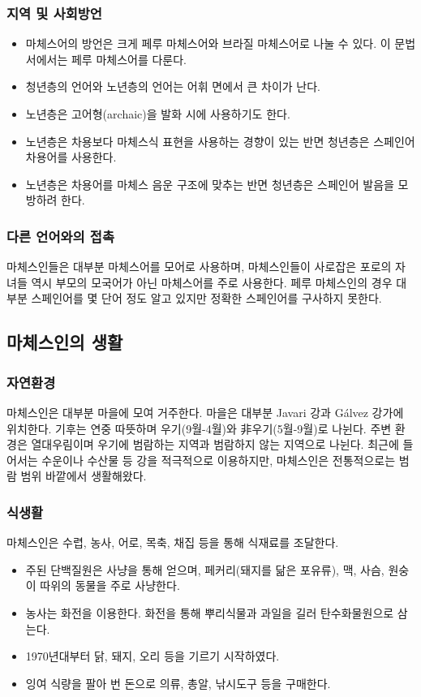 \subsubsection{지역 및 사회방언}
\begin{itemize}
\item 마체스어의 방언은 크게 페루 마체스어와 브라질 마체스어로 나눌 수 있다. 이 문법서에서는 페루 마체스어를 다룬다. 
\item 청년층의 언어와 노년층의 언어는 어휘 면에서 큰 차이가 난다. 
\item 노년층은 고어형(archaic)을 발화 시에 사용하기도 한다. 
\item 노년층은 차용보다 마체스식 표현을 사용하는 경향이 있는 반면 청년층은 스페인어 차용어를 사용한다. 
\item 노년층은 차용어를 마체스 음운 구조에 맞추는 반면 청년층은 스페인어 발음을 모방하려 한다. 
\end{itemize}

\subsubsection{다른 언어와의 접촉}
마체스인들은 대부분 마체스어를 모어로 사용하며, 마체스인들이 사로잡은 포로의 자녀들 역시 부모의 모국어가 아닌 마체스어를 주로 사용한다. 페루 마체스인의 경우 대부분 스페인어를 몇 단어 정도 알고 있지만 정확한 스페인어를 구사하지 못한다. 

\subsection{마체스인의 생활}
\subsubsection{자연환경}
마체스인은 대부분 마을에 모여 거주한다. 마을은 대부분 Javari 강과 Gálvez 강가에 위치한다. 기후는 연중 따뜻하며 우기(9월-4월)와 非우기(5월-9월)로 나뉜다. 주변 환경은 열대우림이며 우기에 범람하는 지역과 범람하지 않는 지역으로 나뉜다. 최근에 들어서는 수운이나 수산물 등 강을 적극적으로 이용하지만, 마체스인은 전통적으로는 범람 범위 바깥에서 생활해왔다. 

\subsubsection{식생활}
마체스인은 수렵, 농사, 어로, 목축, 채집 등을 통해 식재료를 조달한다. 
\begin{itemize}
\item 주된 단백질원은 사냥을 통해 얻으며, 페커리(돼지를 닮은 포유류), 맥, 사슴, 원숭이 따위의 동물을 주로 사냥한다. 
\item 농사는 화전을 이용한다. 화전을 통해 뿌리식물과 과일을 길러 탄수화물원으로 삼는다. 
\item 1970년대부터 닭, 돼지, 오리 등을 기르기 시작하였다. 
\item 잉여 식량을 팔아 번 돈으로 의류, 총알, 낚시도구 등을 구매한다. 
\end{itemize}


